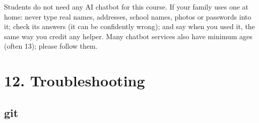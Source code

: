 \documentclass[level=3,teacher]{kidscode}
\begin{document}
\begin{safety}
Students do not need any AI chatbot for this course. If your family uses one at home: never type
real names, addresses, school names, photos or passwords into it; check its answers (it can be
confidently wrong); and say when you used it, the same way you credit any helper. Many chatbot
services also have minimum ages (often 13); please follow them.
\end{safety}

\section{12. Troubleshooting}

\subsection{git}
\end{document}
